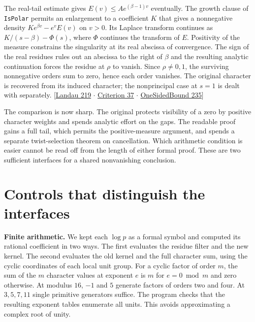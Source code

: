 \documentclass[12pt,letterpaper]{article}
\newcommand{\id}[1]{{\small\nolinkurl{#1}}}
\begin{document}
The real-tail estimate gives $E(v)\le A e^{(\beta-1)v}$ eventually. The growth clause of \id{IsPolar} permits an enlargement to a coefficient $K$ that gives a nonnegative density $K e^{\beta v}-e^vE(v)$ on $v>0$. Its Laplace transform continues as $K/(s-\beta)-\Phi(s)$, where $\Phi$ continues the transform of $E$. Positivity of the measure constrains the singularity at its real abscissa of convergence. The sign of the real residues rules out an abscissa to the right of $\beta$ and the resulting analytic continuation forces the residue at $\rho$ to vanish. Since $\rho\ne0,1$, the surviving nonnegative orders sum to zero, hence each order vanishes. The original character is recovered from its induced character; the nonprincipal case at $s=1$ is dealt with separately. {\small\sffamily\color{mute}[\href{https://github.com/leanprover-community/riemann-hypothesis/blob/e063a923620ee7787b4a1270421478645bf66bdb/src/Lib/Analytic/Landau.lean#L219}{Landau 219} $\cdot$ \href{https://github.com/leanprover-community/riemann-hypothesis/blob/e063a923620ee7787b4a1270421478645bf66bdb/src/New/Reduction/Zeros/Criterion.lean#L37}{Criterion 37} $\cdot$ \href{https://github.com/leanprover-community/riemann-hypothesis/blob/e063a923620ee7787b4a1270421478645bf66bdb/src/New/Reduction/OneSidedBound.lean#L235}{OneSidedBound 235}]}

The comparison is now sharp. The original protects visibility of a zero by positive character weights and spends analytic effort on the gaps. The readable proof gains a full tail, which permits the positive-measure argument, and spends a separate twist-selection theorem on cancellation. Which arithmetic condition is easier cannot be read off from the length of either formal proof. These are two sufficient interfaces for a shared nonvanishing conclusion.

\section{Controls that distinguish the interfaces}
\textbf{Finite arithmetic.} We kept each $\log p$ as a formal symbol and computed its rational coefficient in two ways. The first evaluates the residue filter and the new kernel. The second evaluates the old kernel and the full character sum, using the cyclic coordinates of each local unit group. For a cyclic factor of order $m$, the sum of the $m$ character values at exponent $e$ is $m$ for $e=0\bmod m$ and zero otherwise. At modulus $16$, $-1$ and $5$ generate factors of orders two and four. At $3,5,7,11$ single primitive generators suffice. The program checks that the resulting exponent tables enumerate all units. This avoids approximating a complex root of unity.
\end{document}

